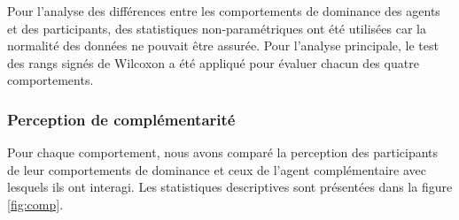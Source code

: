 	Pour l'analyse des différences entre les comportements de dominance des agents et des participants, des statistiques non-paramétriques ont été utilisées car la normalité des données ne pouvait être assurée. Pour l'analyse principale, le test des rangs signés de Wilcoxon a été appliqué pour évaluer chacun des quatre comportements.
	
	\subsubsection{Perception de complémentarité}
	
	Pour chaque comportement, nous avons comparé la perception des participants de leur comportements de dominance et ceux de l'agent complémentaire avec lesquels ils ont interagi. Les statistiques descriptives sont présentées dans la figure \ref{fig:comp}. 
	
